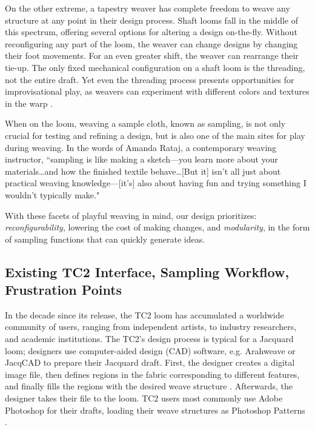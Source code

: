 On the other extreme, a tapestry weaver has complete freedom to weave any structure at any point in their design process. Shaft looms fall in the middle of this spectrum, offering several options for altering a design on-the-fly. Without reconfiguring any part of the loom, the weaver can change designs by changing their foot movements. For an even greater shift, the weaver can rearrange their tie-up. The only fixed mechanical configuration on a shaft loom is the threading, not the entire draft. Yet even the threading process presents opportunities for improvisational play, as weavers can experiment with different colors and textures in the warp \cite{essen_easy_2016}.

When on the loom, weaving a sample cloth, known as sampling, is not only crucial for testing and refining a design, but is also one of the main sites for play during weaving. In the words of Amanda Rataj, a contemporary weaving instructor, ``sampling is like making a sketch---you learn more about your materials\ldots{}and how the finished textile behave\ldots{}[But it] isn’t all just about practical weaving knowledge---[it’s] also about having fun and trying something I wouldn’t typically make." \cite{rataj_tips_2020}

With these facets of playful weaving in mind, our design prioritizes: \textit{reconfigurability}, lowering the cost of making changes, and \textit{modularity}, in the form of sampling functions that can quickly generate ideas.

\subsection{Existing TC2 Interface, Sampling Workflow, Frustration Points}

In the decade since its release, the TC2 loom has accumulated a worldwide community of users, ranging from independent artists, to industry researchers, and academic institutions. The TC2's design process is typical for a Jacquard loom; designers use computer-aided design (CAD) software, e.g. Arahweave \cite{arahweave_2023} or JacqCAD \cite{jacqcad_2019} to prepare their Jacquard draft. First, the designer creates a digital image file, then defines regions in the fabric corresponding to different features, and finally fills the regions with the desired weave structure \cite{holyoke_digital_2013}. Afterwards, the designer takes their file to the loom. TC2 users most commonly use Adobe Photoshop for their drafts, loading their weave structures as Photoshop Patterns \cite{schlein_woven_2007}.

